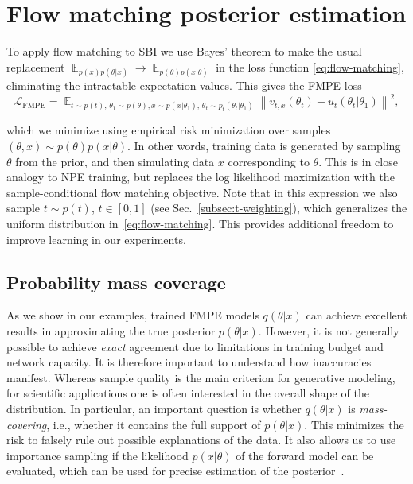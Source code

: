 \documentclass{article}
\theoremstyle{remark}
\DeclareMathOperator{\Ex}{\ensuremath{\mathbb{E}}}
\begin{document}
\section{Flow matching posterior estimation}
\label{sec:fmpe}

To apply flow matching to SBI we use Bayes' theorem to make the usual replacement $\Ex_{p(x)p(\theta|x)} \to \Ex_{p(\theta)p(x|\theta)}$ in the loss function \eqref{eq:flow-matching}, eliminating the intractable expectation values. This gives the FMPE loss
\begin{equation}\label{eq:fmpe-loss}
\mathcal{L}_\text{FMPE} = \Ex_{t\sim p(t),\,\theta_1\sim p(\theta), x\sim p(x|\theta_1), \,\theta_t\sim p_{t}(\theta_t | \theta_1)} \left\| v_{t,x}(\theta_t) - u_{t}(\theta_t| \theta_1)\right\|^2,
\end{equation}

which we minimize using empirical risk minimization over samples $(\theta,x)\sim p(\theta)p(x|\theta)$. In other words, training data is generated by sampling $\theta$ from the prior, and then simulating data $x$ corresponding to $\theta$. This is in close analogy to NPE training, but replaces the log likelihood maximization with the sample-conditional flow matching objective. Note that in this expression we also sample $t \sim p(t)$, $t\in [0,1]$ (see Sec.~\ref{subsec:t-weighting}), which generalizes the uniform distribution in~\eqref{eq:flow-matching}. This provides additional freedom to improve learning in our experiments.
  


\subsection{Probability mass coverage}\label{subsec:mass-coverage}

As we show in our examples, trained FMPE models $q(\theta|x)$ can achieve excellent results in approximating the true posterior $p(\theta|x)$. However, it is not generally possible to achieve \emph{exact} agreement due to limitations in training budget and network capacity. It is therefore important to understand how inaccuracies manifest. Whereas sample quality is the main criterion for generative modeling, for scientific applications one is often interested in the overall shape of the distribution. In particular, an important question is whether $q(\theta|x)$ is \emph{mass-covering}, i.e., whether it contains the full support of $p(\theta|x)$. This minimizes the risk to falsely rule out possible explanations of the data. It also allows us to use importance sampling if the likelihood $p(x|\theta)$ of the forward model can be evaluated, which can be used for precise estimation of the posterior~\cite{muller2019neural,Dax:2022pxd}.
\end{document}
